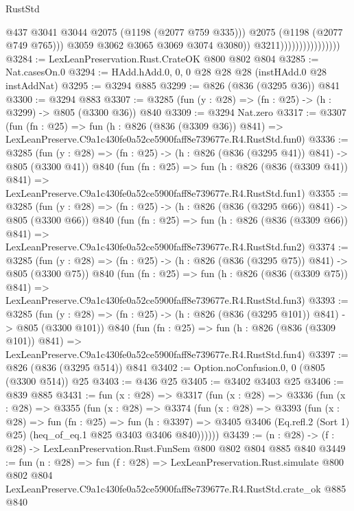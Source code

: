 \begin{lexlean}{RustStd}
\begin{coremodule}
                                            @437
                                            @3041
                                            @3044
                                            @2075
                                            (@1198 (@2077 @759 @335)))
                                          @2075
                                          (@1198 (@2077 @749 @765)))
                                        @3059
                                        @3062
                                        @3065
                                        @3069
                                        @3074
                                        @3080))
                                    @3211))))))))))))))))
@3284 := LexLeanPreservation.Rust.CrateOK @800 @802 @804
@3285 := Nat.casesOn.{0}
@3294 := HAdd.hAdd.{0, 0, 0} @28 @28 @28 (instHAdd.{0} @28 instAddNat)
@3295 := @3294 @885
@3299 := @826 (@836 (@3295 @36)) @841
@3300 := @3294 @883
@3307 := @3285 (fun (y : @28) => (fn : @25) -> (h : @3299) -> @805 (@3300 @36)) @840
@3309 := @3294 Nat.zero
@3317 := @3307
    (fun (fn : @25) =>
    fun (h : @826 (@836 (@3309 @36)) @841) =>
    LexLeanPreserve.C9a1c430fe0a52ce5900faff8e739677e.R4.RustStd.fun0)
@3336 := @3285
    (fun (y : @28) => (fn : @25) -> (h : @826 (@836 (@3295 @41)) @841) -> @805 (@3300 @41))
    @840
    (fun (fn : @25) =>
    fun (h : @826 (@836 (@3309 @41)) @841) =>
    LexLeanPreserve.C9a1c430fe0a52ce5900faff8e739677e.R4.RustStd.fun1)
@3355 := @3285
    (fun (y : @28) => (fn : @25) -> (h : @826 (@836 (@3295 @66)) @841) -> @805 (@3300 @66))
    @840
    (fun (fn : @25) =>
    fun (h : @826 (@836 (@3309 @66)) @841) =>
    LexLeanPreserve.C9a1c430fe0a52ce5900faff8e739677e.R4.RustStd.fun2)
@3374 := @3285
    (fun (y : @28) => (fn : @25) -> (h : @826 (@836 (@3295 @75)) @841) -> @805 (@3300 @75))
    @840
    (fun (fn : @25) =>
    fun (h : @826 (@836 (@3309 @75)) @841) =>
    LexLeanPreserve.C9a1c430fe0a52ce5900faff8e739677e.R4.RustStd.fun3)
@3393 := @3285
    (fun (y : @28) => (fn : @25) -> (h : @826 (@836 (@3295 @101)) @841) -> @805 (@3300 @101))
    @840
    (fun (fn : @25) =>
    fun (h : @826 (@836 (@3309 @101)) @841) =>
    LexLeanPreserve.C9a1c430fe0a52ce5900faff8e739677e.R4.RustStd.fun4)
@3397 := @826 (@836 (@3295 @514)) @841
@3402 := Option.noConfusion.{0, 0} (@805 (@3300 @514)) @25
@3403 := @436 @25
@3405 := @3402 @3403 @25
@3406 := @839 @885
@3431 := fun (x : @28) =>
  @3317
    (fun (x : @28) =>
    @3336
      (fun (x : @28) =>
      @3355
        (fun (x : @28) =>
        @3374
          (fun (x : @28) =>
          @3393
            (fun (x : @28) =>
            fun (fn : @25) =>
            fun (h : @3397) =>
            @3405 @3406 (Eq.refl.{2} (Sort 1) @25) (heq_of_eq.{1} @825 @3403 @3406 @840))))))
@3439 := (n : @28) -> (f : @28) -> LexLeanPreservation.Rust.FunSem @800 @802 @804 @885 @840
@3449 := fun (n : @28) =>
  fun (f : @28) =>
  LexLeanPreservation.Rust.simulate
    @800
    @802
    @804
    LexLeanPreserve.C9a1c430fe0a52ce5900faff8e739677e.R4.RustStd.crate_ok
    @885
    @840
\end{coremodule}
\end{lexlean}
